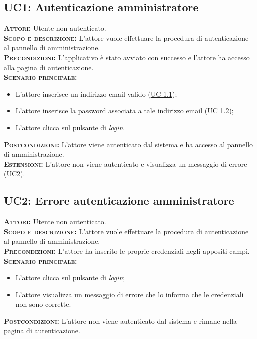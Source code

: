 \setlength{\parindent}{0cm}
\subsection{UC1: Autenticazione amministratore}
\label{sec:uc1}
\textsc{\textsc{\textbf{Attori:}}} Utente non autenticato.\\
\textsc{\textbf{Scopo e descrizione:}} L'attore vuole effettuare la procedura di autenticazione al pannello di amministrazione.\\
\textsc{\textsc{\textbf{Precondizioni:}}} L'applicativo è stato avviato con successo e l'attore ha accesso alla pagina di autenticazione.\\
\textsc{\textbf{Scenario principale:}}
\begin{itemize}
    \item L'attore inserisce un indirizzo email valido (\hyperref[sec:uc11]{UC 1.1});
    \item L'attore inserisce la password associata a tale indirizzo email (\hyperref[sec:uc12]{UC 1.2});
    \item L'attore clicca sul pulsante di \textit{login}.
\end{itemize}
\textsc{\textbf{Postcondizioni:}} L'attore viene autenticato dal sistema e ha accesso al pannello di amministrazione.\\
\textsc{\textbf{Estensioni:}} L'attore non viene autenticato e visualizza un messaggio di errore (\hyperref[sec:uc2]UC2{}).

\subsection{UC2: Errore autenticazione amministratore}
\label{sec:uc2}
\textsc{\textbf{Attori:}} Utente non autenticato.\\
\textsc{\textbf{Scopo e descrizione:}} L'attore vuole effettuare la procedura di autenticazione al pannello di amministrazione.\\
\textsc{\textsc{\textbf{Precondizioni:}}} L'attore ha inserito le proprie credenziali negli appositi campi.\\
\textsc{\textbf{Scenario principale:}}
\begin{itemize}
    \item L'attore clicca sul pulsante di \textit{login};
    \item L'attore visualizza un messaggio di errore che lo informa che le credenziali non sono corrette.
\end{itemize}
\textsc{\textbf{Postcondizioni:}} L'attore non viene autenticato dal sistema e rimane nella pagina di autenticazione.

